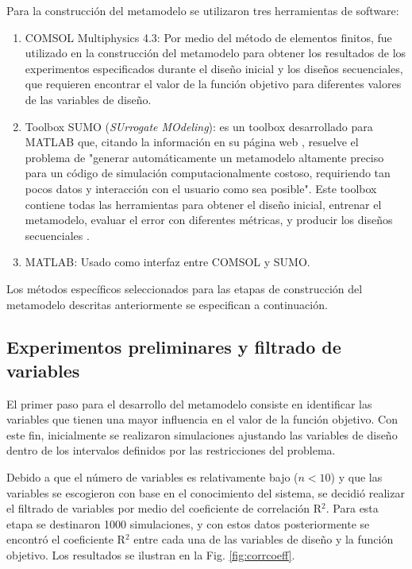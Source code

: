 Para la construcción del metamodelo se utilizaron tres herramientas de software:
\begin{enumerate}
\item COMSOL Multiphysics 4.3: Por medio del método de elementos finitos, fue utilizado en la construcción del metamodelo para obtener los resultados de los experimentos especificados durante el diseño inicial y los diseños secuenciales, que requieren encontrar el valor de la función objetivo para diferentes valores de las variables de diseño.
\item Toolbox SUMO (\textit{SUrrogate MOdeling}): es un toolbox desarrollado para MATLAB que, citando la información en su página web \cite{sumoabout}, resuelve el problema de "generar automáticamente un metamodelo altamente preciso para un código de simulación computacionalmente costoso, requiriendo tan pocos datos y interacción con el usuario como sea posible". Este toolbox contiene todas las herramientas para obtener el diseño inicial, entrenar el metamodelo, evaluar el error con diferentes métricas, y producir los diseños secuenciales \cite{gorissen2010b}.
\item MATLAB: Usado como interfaz entre COMSOL y SUMO.
\end{enumerate}

Los métodos específicos seleccionados para las etapas de construcción del metamodelo descritas anteriormente se especifican a continuación.

\subsection{Experimentos preliminares y filtrado de variables}
El primer paso para el desarrollo del metamodelo consiste en identificar las variables que tienen una mayor influencia en el valor de la función objetivo. Con este fin, inicialmente se realizaron simulaciones ajustando las variables de diseño dentro de los intervalos definidos por las restricciones del problema.

Debido a que el número de variables es relativamente bajo ($n < 10$) y que las variables se escogieron con base en el conocimiento del sistema, se decidió realizar el filtrado de variables por medio del coeficiente de correlación R$^2$. Para esta etapa se destinaron 1000 simulaciones, y con estos datos posteriormente se encontró el coeficiente R$^2$ entre cada una de las variables de diseño y la función objetivo. Los resultados se ilustran en la Fig. \ref{fig:corrcoeff}.

